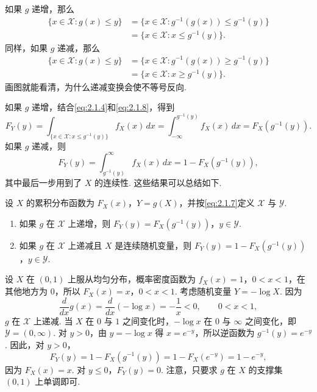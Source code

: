 如果 $g$ 递增，那么
\begin{equation}\label{eq:2.1.8}
\begin{aligned}
\{x\in\mathscr X:g(x)\le y\}
&=\{x\in\mathscr X:g^{-1}(g(x))\le g^{-1}(y)\}\\
&=\{x\in\mathscr X:x\le g^{-1}(y)\}.
\end{aligned}
\end{equation}
同样，如果 $g$ 递减，那么
\begin{equation}\label{eq:2.1.9}
\begin{aligned}
\{x\in\mathscr X:g(x)\le y\}
&=\{x\in\mathscr X:g^{-1}(g(x))\ge g^{-1}(y)\}\\
&=\{x\in\mathscr X:x\ge g^{-1}(y)\}.
\end{aligned}
\end{equation}
画图就能看清，为什么递减变换会使不等号反向.

如果 $g$ 递增，结合\eqref{eq:2.1.4}和\eqref{eq:2.1.8}，得到
$$F_Y(y)=\int_{\{x\in\mathscr X:x\le g^{-1}(y)\}}f_X(x)\,dx
=\int_{-\infty}^{g^{-1}(y)}f_X(x)\,dx=F_X(g^{-1}(y)).$$
如果 $g$ 递减，则
$$F_Y(y)=\int_{g^{-1}(y)}^\infty f_X(x)\,dx=1-F_X(g^{-1}(y)),$$
其中最后一步用到了 $X$ 的连续性. 这些结果可以总结如下.

\begin{theorem}\label{thm:2.1.3}
设 $X$ 的累积分布函数为 $F_X(x)$，$Y=g(X)$，并按\eqref{eq:2.1.7}定义 $\mathscr X$ 与 $\mathscr Y$.
\begin{enumerate}
\item[(a)] 如果 $g$ 在 $\mathscr X$ 上递增，则 $F_Y(y)=F_X(g^{-1}(y))$，$y\in\mathscr Y$.
\item[(b)] 如果 $g$ 在 $\mathscr X$ 上递减且 $X$ 是连续随机变量，则 $F_Y(y)=1-F_X(g^{-1}(y))$，$y\in\mathscr Y$.
\end{enumerate}
\end{theorem}

\begin{example}[均匀分布与指数分布的关系——I]\label{ex:2.1.4}
设 $X$ 在 $(0,1)$ 上服从均匀分布，概率密度函数为 $f_X(x)=1$，$0<x<1$，在其他地方为 $0$，所以 $F_X(x)=x$，$0<x<1$. 考虑随机变量 $Y=-\log X$. 因为
$$\frac d{dx}g(x)=\frac d{dx}(-\log x)=-\frac1x<0,\qquad 0<x<1,$$
$g$ 在 $\mathscr X$ 上递减. 当 $X$ 在 $0$ 与 $1$ 之间变化时，$-\log x$ 在 $0$ 与 $\infty$ 之间变化，即 $\mathscr Y=(0,\infty)$. 对 $y>0$，由 $y=-\log x$ 得 $x=e^{-y}$，所以逆函数为 $g^{-1}(y)=e^{-y}$. 因此，对 $y>0$，
$$F_Y(y)=1-F_X(g^{-1}(y))=1-F_X(e^{-y})=1-e^{-y},$$
因为 $F_X(x)=x$. 对 $y\le0$，$F_Y(y)=0$. 注意，只要求 $g$ 在 $X$ 的支撑集 $(0,1)$ 上单调即可.
\end{example}

